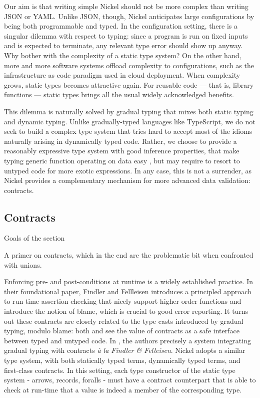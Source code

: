 \documentclass{article}
\begin{document}
Our aim is that writing simple Nickel should not be more complex than writing
JSON or YAML. Unlike JSON, though, Nickel anticipates large configurations by
being both programmable and typed. In the configuration setting, there is a
singular dilemma with respect to typing: since a program is run on fixed inputs
and is expected to terminate, any relevant type error should show up anyway.
Why bother with the complexity of a static type system? On the other hand, more
and more software systems offload complexity to configurations, such as the
infrastructure as code paradigm used in cloud deployment. When complexity grows,
static types becomes attractive again. For reusable code — that is, library
functions — static types brings all the usual widely acknowledged benefits.

This dilemma is naturally solved by gradual typing\cite{Siek06gradualtyping}
that mixes both static typing and dynamic typing. Unlike gradually-typed
languages like TypeScript, we do not seek to build a complex type system that
tries hard to accept most of the idioms naturally arising in dynamically typed
code. Rather, we choose to provide a reasonably expressive type system with good
inference properties, that make typing generic function operating on data easy ,
but may require to resort to untyped code for more exotic expressions.  In any
case, this is not a surrender, as Nickel provides a complementary mechanism for
more advanced data validation: contracts.

\subsection{Contracts}
\color{red}Goals of the section

A primer on contracts, which in the end are the problematic bit when confronted
with unions.\vspace{0.5cm}

\color{black}


Enforcing pre- and post-conditions at runtime is a widely established practice.
In their foundational paper\cite{FindlerFelleisenHOContracts}, Findler and
Fellleisen introduces a principled approach to run-time assertion checking that
nicely support higher-order functions and introduce the notion of blame, which
is crucial to good error reporting. It turns out these contracts are closely
related to the type casts introduced by gradual typing, modulo blame: both
\cite{FindlerMultiLang} and \cite{FelleisenInterLang} see the value of contracts
as a safe interface between typed and untyped code. In \cite{WellTypedBlamed},
the authors precisely a system integrating gradual typing with contracts
\textit{à la Findler \& Felleisen}. Nickel adopts a similar type system, with
both statically typed terms, dynamically typed terms, and first-class contracts.
In this setting, each type constructor of the static type system - arrows,
records, foralls - must have a contract counterpart that is able to check at
run-time that a value is indeed a member of the corresponding type.
\end{document}
